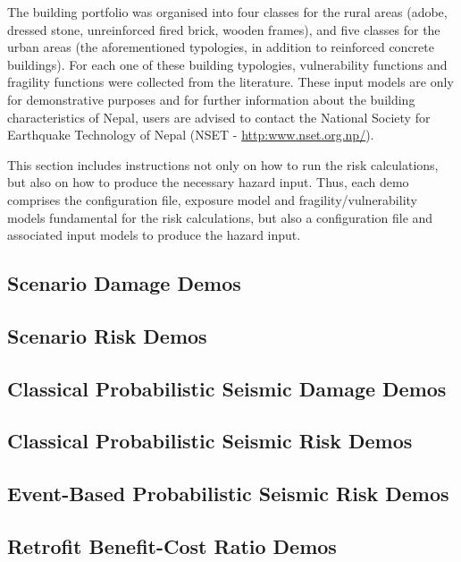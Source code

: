 The building portfolio was organised into four classes for the rural areas (adobe, dressed stone, unreinforced fired brick, wooden frames), and five classes for the urban areas (the aforementioned typologies, in addition to reinforced concrete buildings). For each one of these building typologies, \glspl{vulnerability function} and \glspl{fragility function} were collected from the literature. These input models are only for demonstrative purposes and for further information about the building characteristics of Nepal, users are advised to contact the National Society for Earthquake Technology of Nepal (NSET - \href{http://www.nset.org.np/}{http:www.nset.org.np/}).

This section includes instructions not only on how to run the risk calculations, but also on how to produce the necessary hazard input. Thus, each demo comprises the configuration file, exposure model and fragility/vulnerability models fundamental for the risk calculations, but also a configuration file and associated input models to produce the hazard input.


\subsection{Scenario Damage Demos}
\label{subsec:demos_scenario_damage}


\subsection{Scenario Risk Demos}
\label{subsec:demos_scenario_risk}


\subsection{Classical Probabilistic Seismic Damage Demos}
\label{subsec:demos_classical_damage}


\subsection{Classical Probabilistic Seismic Risk Demos}
\label{subsec:demos_classical_risk}


\subsection{Event-Based Probabilistic Seismic Risk Demos}
\label{subsec:demos_event_based_risk}


\subsection{Retrofit Benefit-Cost Ratio Demos}
\label{subsec:demos_benefit_cost}
